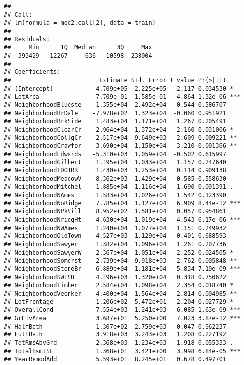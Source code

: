 \documentclass[
]{article}
\begin{document}
\begin{verbatim}
## 
## Call:
## lm(formula = mod2.call[2], data = train)
## 
## Residuals:
##     Min      1Q  Median      3Q     Max 
## -393429  -12267    -636   10598  238004 
## 
## Coefficients:
##                         Estimate Std. Error t value Pr(>|t|)    
## (Intercept)           -4.709e+05  2.225e+05  -2.117 0.034530 *  
## LotArea                7.709e-01  1.585e-01   4.864 1.32e-06 ***
## NeighborhoodBlueste   -1.355e+04  2.492e+04  -0.544 0.586707    
## NeighborhoodBrDale    -7.978e+02  1.323e+04  -0.060 0.951921    
## NeighborhoodBrkSide    1.483e+04  1.171e+04   1.267 0.205491    
## NeighborhoodClearCr    2.964e+04  1.372e+04   2.160 0.031006 *  
## NeighborhoodCollgCr    2.517e+04  9.649e+03   2.609 0.009221 ** 
## NeighborhoodCrawfor    3.690e+04  1.150e+04   3.210 0.001366 ** 
## NeighborhoodEdwards   -5.310e+03  1.059e+04  -0.502 0.615997    
## NeighborhoodGilbert    1.195e+04  1.033e+04   1.157 0.247640    
## NeighborhoodIDOTRR     1.430e+03  1.253e+04   0.114 0.909138    
## NeighborhoodMeadowV   -8.362e+03  1.429e+04  -0.585 0.558630    
## NeighborhoodMitchel    1.885e+04  1.116e+04   1.690 0.091391 .  
## NeighborhoodNAmes      1.583e+04  1.026e+04   1.542 0.123390    
## NeighborhoodNoRidge    7.785e+04  1.127e+04   6.909 8.44e-12 ***
## NeighborhoodNPkVill    8.952e+02  1.581e+04   0.057 0.954861    
## NeighborhoodNridgHt    4.630e+04  1.019e+04   4.543 6.17e-06 ***
## NeighborhoodNWAmes     1.240e+04  1.077e+04   1.151 0.249932    
## NeighborhoodOldTown    4.527e+03  1.129e+04   0.401 0.688593    
## NeighborhoodSawyer     1.382e+04  1.096e+04   1.261 0.207736    
## NeighborhoodSawyerW    2.367e+04  1.051e+04   2.252 0.024505 *  
## NeighborhoodSomerst    2.739e+04  9.918e+03   2.762 0.005848 ** 
## NeighborhoodStoneBr    6.889e+04  1.181e+04   5.834 7.19e-09 ***
## NeighborhoodSWISU      4.196e+03  1.320e+04   0.318 0.750622    
## NeighborhoodTimber     2.584e+04  1.098e+04   2.354 0.018740 *  
## NeighborhoodVeenker    4.400e+04  1.564e+04   2.814 0.004985 ** 
## LotFrontage           -1.206e+02  5.472e+01  -2.204 0.027729 *  
## OverallCond            7.554e+03  1.241e+03   6.085 1.63e-09 ***
## GrLivArea              3.687e+01  5.250e+00   7.023 3.87e-12 ***
## HalfBath               1.307e+02  2.759e+03   0.047 0.962237    
## FullBath               3.918e+03  3.243e+03   1.208 0.227192    
## TotRmsAbvGrd           2.368e+03  1.234e+03   1.918 0.055333 .  
## TotalBsmtSF            1.368e+01  3.421e+00   3.998 6.84e-05 ***
## YearRemodAdd           5.593e+01  8.245e+01   0.678 0.497701    

\end{verbatim}
\end{document}
